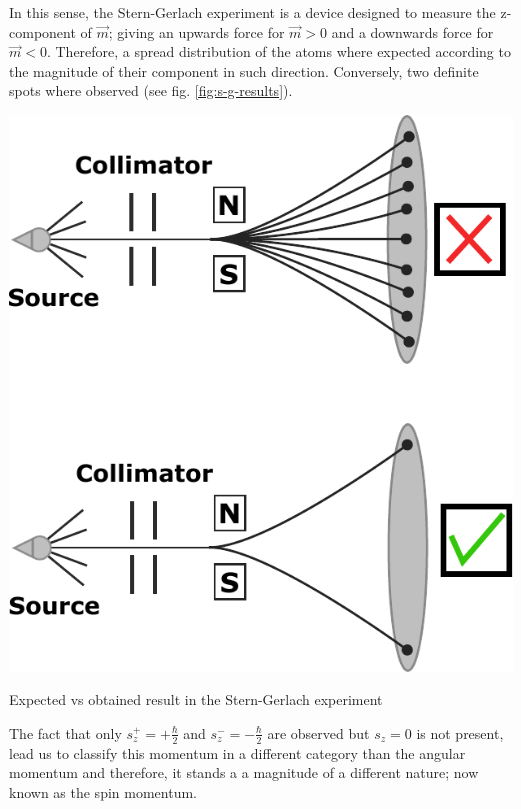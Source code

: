 \documentclass{article}
\begin{document}
In this sense, the Stern-Gerlach experiment is a device designed to measure the z-component of $\vec{m}$; giving an upwards force for $\vec{m}>0$ and a downwards force for $\vec{m}<0$. Therefore, a spread distribution of the atoms where expected according to the magnitude of their component in such direction. Conversely, two definite spots where observed (see fig. \ref{fig:s-g-results}).
\begin{marginfigure}%
  \begin{centering}
  \includegraphics[width=\linewidth]{figures/s-g-result.pdf}
  \caption{Expected vs obtained result in the Stern-Gerlach experiment}
  \label{fig:s-g-results}
  \end{centering}
\end{marginfigure}
The fact that only $s_z ^+=+\frac{\hbar}{2}$ and $s_z ^-=-\frac{\hbar}{2}$ are observed but $s_z=0$ is not present, lead us to classify this momentum in a different category than the angular momentum and therefore, it stands a a magnitude of a different nature; now known as the spin momentum.
\end{document}
